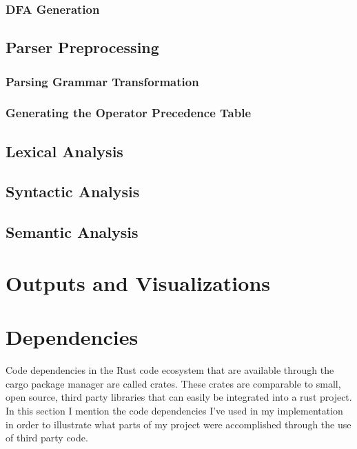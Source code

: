 \subsubsection{DFA Generation}



\subsection{Parser Preprocessing}

\subsubsection{Parsing Grammar Transformation} \label{parsing_grammar_transformation}

\subsubsection{Generating the Operator Precedence Table}

\subsection{Lexical Analysis}

\subsection{Syntactic Analysis}

\subsection{Semantic Analysis}

\section{Outputs and Visualizations} \label{outputs_and_visualizations}

\section{Dependencies} \label{dependancies}

Code dependencies in the Rust code ecosystem that are  available through the cargo package manager
are called crates. These crates are comparable to small, open source, third party libraries that can
easily be integrated into a rust project. In this section I mention the code dependencies I've used
in my implementation in order to illustrate what parts of my project were accomplished through the
use of third party code.

